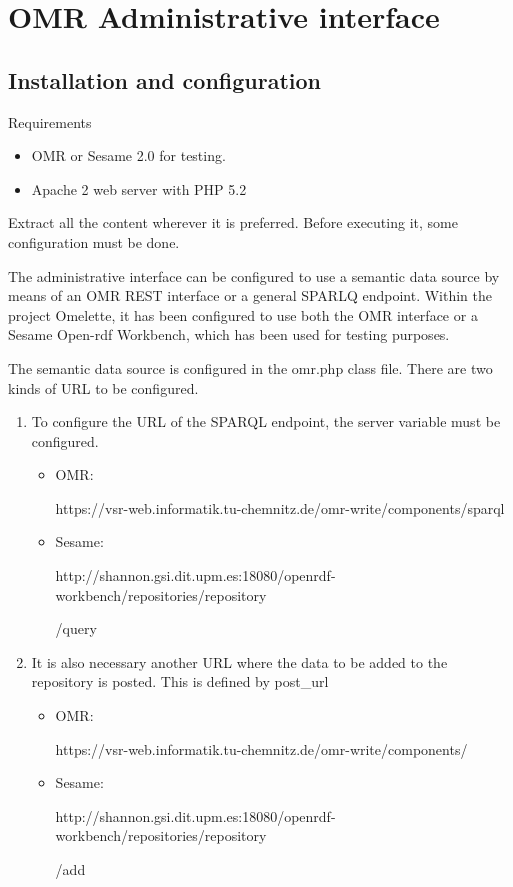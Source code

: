 \chapter{OMR Administrative interface}
\label{chap:omradmininstall}

\section{Installation and configuration}
Requirements

\begin{itemize}
	\item OMR or Sesame 2.0 for testing.
	\item Apache 2 web server with PHP 5.2
\end{itemize}

Extract all the content wherever it is preferred. Before executing it, some configuration must
be done.

The administrative interface can be configured to use a semantic data source by means of an
OMR REST interface or a general SPARLQ endpoint. Within the project Omelette, it has been configured to use both the OMR interface or a Sesame Open-rdf Workbench, which has been used for testing purposes.

The semantic data source is configured in the omr.php class file.
There are two kinds of URL to be configured.

\begin{enumerate}
	\item To configure the URL of the SPARQL endpoint, the server variable must be
	configured.
		\begin{itemize}
		\item OMR: 
		
		https://vsr-web.informatik.tu-chemnitz.de/omr-write/components/sparql
		\item Sesame: 
		
		http://shannon.gsi.dit.upm.es:18080/openrdf-workbench/repositories/repository
		
		/query
		\end{itemize}
	\item It is also necessary another URL where the data to be added to the repository is
	posted. This is defined by post\_url
		\begin{itemize}
		\item OMR: 
		
		https://vsr-web.informatik.tu-chemnitz.de/omr-write/components/
		\item Sesame:
		
		http://shannon.gsi.dit.upm.es:18080/openrdf-workbench/repositories/repository
		
		/add
		\end{itemize}
\end{enumerate}


